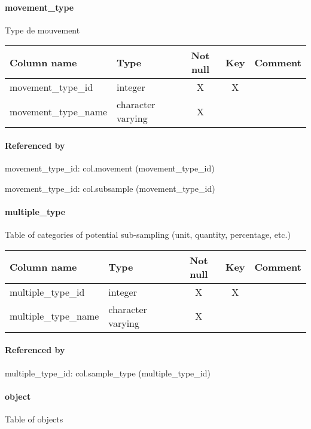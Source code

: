 \paragraph{movement\_type}
Type de mouvement

\begin{tabular}{|l| p{2cm}|c|c| p{5cm}|}
\hline
Column name & Type & Not null & Key & Comment \\
\hline
movement\_type\_id & integer & X & X & \\
movement\_type\_name & character varying & X &  & \\
\hline
\end{tabular}
\paragraph{Referenced by}
movement\_type\_id: col.movement (movement\_type\_id)

movement\_type\_id: col.subsample (movement\_type\_id)

\paragraph{multiple\_type}
Table of categories of potential sub-sampling (unit, quantity, percentage, etc.)

\begin{tabular}{|l| p{2cm}|c|c| p{5cm}|}
\hline
Column name & Type & Not null & Key & Comment \\
\hline
multiple\_type\_id & integer & X & X & \\
multiple\_type\_name & character varying & X &  & \\
\hline
\end{tabular}
\paragraph{Referenced by}
multiple\_type\_id: col.sample\_type (multiple\_type\_id)

\paragraph{object}
Table of objects

